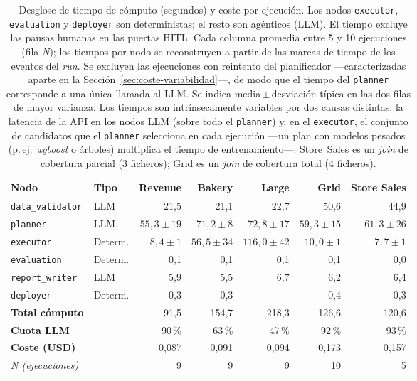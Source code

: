 \begin{table}[H]
\centering
\caption{Desglose de tiempo de cómputo (segundos) y coste por ejecución. Los nodos
 \texttt{executor}, \texttt{evaluation} y \texttt{deployer} son deterministas; el resto
 son agénticos (LLM). El tiempo excluye las pausas humanas en las puertas HITL.
 Cada columna promedia entre 5 y 10 ejecuciones (fila \textit{N}); los tiempos por nodo se
 reconstruyen a partir de las marcas de tiempo de los eventos del \textit{run}. Se excluyen
 las ejecuciones con reintento del planificador —caracterizadas aparte en la
 Sección~\ref{sec:coste-variabilidad}—, de modo que el tiempo del \texttt{planner}
 corresponde a una única llamada al LLM. Se indica
 media\,$\pm$\,desviación típica en las dos filas de mayor varianza. Los tiempos son
 intrínsecamente variables por dos causas distintas: la latencia de la API en los nodos LLM
 (sobre todo el \texttt{planner}) y, en el \texttt{executor}, el conjunto de candidatos que
 el \texttt{planner} selecciona en cada ejecución —un plan con modelos pesados (p.\,ej.\
 \textit{xgboost} o árboles) multiplica el tiempo de entrenamiento—. Store~Sales es un
 \textit{join} de cobertura parcial (3 ficheros); Grid es un \textit{join} de cobertura
 total (4 ficheros).}
\label{tab:coste-desglose}
\small
\setlength{\tabcolsep}{4pt}
\begin{tabular}{llrrrrr}
\toprule
\textbf{Nodo} & \textbf{Tipo}
  & \textbf{Revenue} & \textbf{Bakery} & \textbf{Large} & \textbf{Grid} & \textbf{Store Sales} \\
\midrule
\texttt{data\_validator} & LLM    & 21,5 & 21,1 & 22,7 & 50,6 & 44,9 \\
\texttt{planner}         & LLM    & $55{,}3{\pm}19$ & $71{,}2{\pm}8$ & $72{,}8{\pm}17$ & $59{,}3{\pm}15$ & $61{,}3{\pm}26$ \\
\texttt{executor}        & Determ.& $8{,}4{\pm}1$ & $56{,}5{\pm}34$ & $116{,}0{\pm}42$ & $10{,}0{\pm}1$ & $7{,}7{\pm}1$ \\
\texttt{evaluation}      & Determ.& 0,1 & 0,1 & 0,1 & 0,1 & 0,0 \\
\texttt{report\_writer}  & LLM    & 5,9 & 5,5 & 6,7 & 6,2 & 6,4 \\
\texttt{deployer}        & Determ.& 0,3 & 0,3 & — & 0,4 & 0,3 \\
\midrule
\textbf{Total cómputo}   &        & 91,5 & 154,7 & 218,3 & 126,6 & 120,6 \\
\textbf{Cuota LLM}       &        & 90\,\% & 63\,\% & 47\,\% & 92\,\% & 93\,\% \\
\midrule
\textbf{Coste (USD)}     &        & 0,087 & 0,091 & 0,094 & 0,173 & 0,157 \\
\midrule
\multicolumn{2}{l}{\textit{N (ejecuciones)}} & 9 & 9 & 9 & 10 & 5 \\
\bottomrule
\end{tabular}
\end{table}

